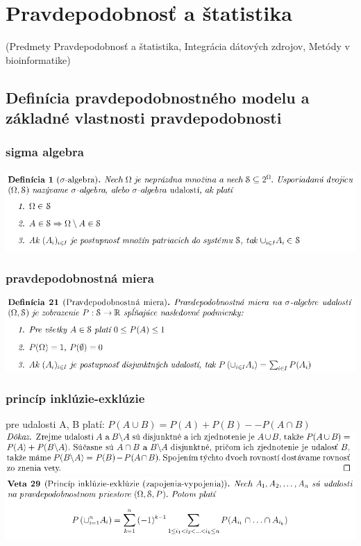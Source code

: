 \chapter[Pravdepodobnosť a štatistika]{Pravdepodobnosť a štatistika}
\label{pravdepodobnost_a_statistika} %

(Predmety Pravdepodobnosť a štatistika, Integrácia dátových zdrojov, Metódy v bioinformatike)

\section{Definícia pravdepodobnostného modelu a základné vlastnosti pravdepodobnosti}

\subsection {sigma algebra}
\includegraphics[width=1\textwidth]{images/sigma_alg}\\
\subsection {pravdepodobnostná miera}
\includegraphics[width=1\textwidth]{images/pravd_mier}\\
\subsection {princíp inklúzie-exklúzie}
pre udalosti A, B platí: $P (A \cup B) = P (A) + P (B) -- P (A \cap B)$\\
\includegraphics[width=1\textwidth]{images/inklu_1}\\
\includegraphics[width=1\textwidth]{images/inkluzia_ex}\\

